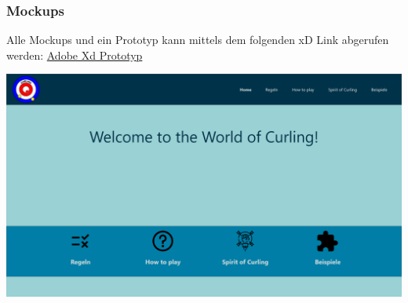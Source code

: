 \documentclass[11pt]{article}
\begin{document}
    \pagebreak

    \begin{landscape}
        \subsubsection{Mockups}

        Alle Mockups und ein Prototyp kann mittels dem folgenden xD Link abgerufen werden: \href{https://xd.adobe.com/view/f4f23c9c-e25a-4ecb-8a2d-38adebf22483-a1a1/?fullscreen}{Adobe Xd Prototyp}

        \noindent
        \begin{minipage}{1.1\textwidth}
            \includegraphics[width=\linewidth]{media/home}
        \end{minipage}
        \begin{minipage}[c]{0.4\textwidth}
            \raggedleft

\end{minipage}
\end{landscape}
\end{document}

